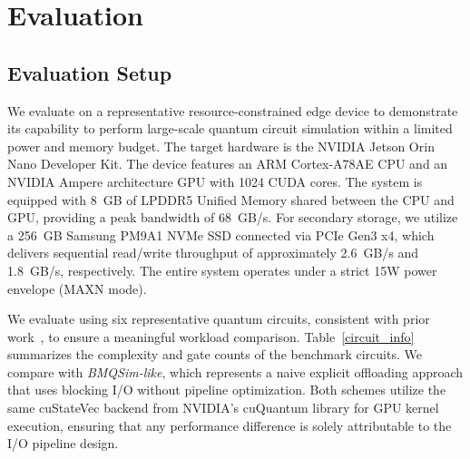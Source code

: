 \section{Evaluation}
\label{sec:eval}

\subsection{Evaluation Setup}

We evaluate \EdgeQuantum on a representative resource-constrained edge device to demonstrate its capability to perform large-scale quantum circuit simulation within a limited power and memory budget.
The target hardware is the NVIDIA Jetson Orin Nano Developer Kit.
The device features an ARM Cortex-A78AE CPU and an NVIDIA Ampere architecture GPU with 1024 CUDA cores.
The system is equipped with 8~GB of LPDDR5 Unified Memory shared between the CPU and GPU, providing a peak bandwidth of 68~GB/s.
For secondary storage, we utilize a 256~GB Samsung PM9A1 NVMe SSD connected via PCIe Gen3 x4, which delivers sequential read/write throughput of approximately 2.6~GB/s and 1.8~GB/s, respectively.
The entire system operates under a strict 15W power envelope (MAXN mode).

We evaluate \EdgeQuantum using six representative quantum circuits, consistent with prior work~\cite{10.1145/3771577}, to ensure a meaningful workload comparison.
Table~\ref{circuit_info} summarizes the complexity and gate counts of the benchmark circuits.
We compare \EdgeQuantum with \textit{BMQSim-like}, which represents a naive explicit offloading approach that uses blocking I/O without pipeline optimization.
Both schemes utilize the same cuStateVec backend from NVIDIA's cuQuantum library for GPU kernel execution, ensuring that any performance difference is solely attributable to the I/O pipeline design.


